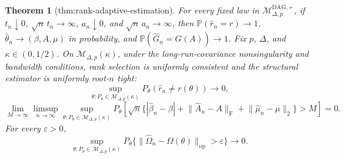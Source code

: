 \documentclass{article}
\newtheorem{theorem}{Theorem}
\begin{document}
\begin{theorem}[thm:rank-adaptive-estimation]\label{thm:rank-adaptive-estimation}
For every fixed law in \(\mathcal M_{\Delta,p}^{\mathrm{DAG},+}\), if \(t_n\downarrow0\), \(\sqrt n\,t_n\to\infty\), \(a_n\downarrow0\), and \(\sqrt n\,a_n\to\infty\), then \(\mathbb P(\widehat r_n=r)\to1\), \(\widehat\theta_n\to(\beta,A,\mu)\) in probability, and \(\mathbb P(\widehat G_n=G(A))\to1\). Fix \(p\), \(\Delta\), and \(\kappa\in(0,1/2)\). On \(\mathcal M_{\Delta,p}(\kappa)\), under the long-run-covariance nonsingularity and bandwidth conditions, rank selection is uniformly consistent and the structural estimator is uniformly root-\(n\) tight: \[\sup_{\theta:P_{\theta}\in\mathcal M_{\Delta,p}(\kappa)}P_{\theta}(\widehat r_n\neq r(\theta))\longrightarrow0,\] \[\lim_{M\to\infty}\limsup_{n\to\infty}\sup_{\theta:P_{\theta}\in\mathcal M_{\Delta,p}(\kappa)}P_{\theta}\!\left[\sqrt n\{ |\widehat\beta_n-\beta|+\lVert\widehat A_n-A\rVert_{\mathrm F}+\lVert\widehat\mu_n-\mu\rVert_2\}>M\right]=0.\] For every \(\varepsilon>0\), \[\sup_{\theta:P_{\theta}\in\mathcal M_{\Delta,p}(\kappa)}P_{\theta}\{\lVert\widehat\Omega_n-\Omega(\theta)\rVert_{\mathrm{op}}>\varepsilon\}\longrightarrow0.\]
\end{theorem}
\end{document}
